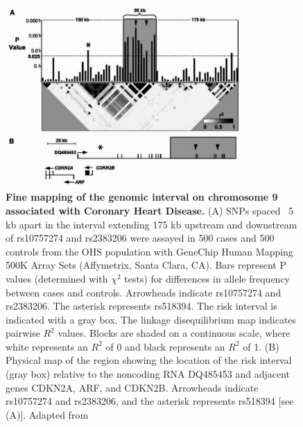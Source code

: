 \begin{figure}[h]
\centering
\includegraphics[width=0.8\textwidth]{Figures/9p21.png}
\caption[Fine mapping of the genomic interval on chromosome 9 associated with Coronary Heart Disease.]{\textbf{Fine mapping of the genomic interval on chromosome 9 associated with Coronary Heart Disease.} (A) SNPs spaced ~5 kb apart in the interval extending 175 kb upstream and downstream of rs10757274 and rs2383206 were assayed in 500 cases and 500 controls from the OHS population with GeneChip Human Mapping 500K Array Sets (Affymetrix, Santa Clara, CA). Bars represent P values (determined with $\chi^2$ tests) for differences in allele frequency between cases and controls. Arrowheads indicate rs10757274 and rs2383206. The asterisk represents rs518394. The risk interval is indicated with a gray box. The linkage disequilibrium map indicates pairwise $R^2$ values. Blocks are shaded on a continuous scale, where white represents an $R^2$ of 0 and black represents an $R^2$ of 1. (B) Physical map of the region showing the location of the risk interval (gray box) relative to the noncoding RNA DQ485453 and adjacent genes CDKN2A, ARF, and CDKN2B. Arrowheads indicate rs10757274 and rs2383206, and the asterisk represents rs518394 [see (A)]. Adapted from \cite{McPherson2007a}}
\end{figure}

